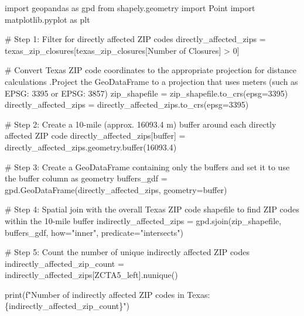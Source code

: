 \documentclass[
  letterpaper,
  DIV=11,
  numbers=noendperiod]{scrartcl}
\newenvironment{Shaded}{\begin{snugshade}}{\end{snugshade}}
\newcommand{\BuiltInTok}[1]{\textcolor[rgb]{0.00,0.23,0.31}{#1}}
\newcommand{\CommentTok}[1]{\textcolor[rgb]{0.37,0.37,0.37}{#1}}
\newcommand{\DecValTok}[1]{\textcolor[rgb]{0.68,0.00,0.00}{#1}}
\newcommand{\FloatTok}[1]{\textcolor[rgb]{0.68,0.00,0.00}{#1}}
\newcommand{\ImportTok}[1]{\textcolor[rgb]{0.00,0.46,0.62}{#1}}
\newcommand{\NormalTok}[1]{\textcolor[rgb]{0.00,0.23,0.31}{#1}}
\newcommand{\OperatorTok}[1]{\textcolor[rgb]{0.37,0.37,0.37}{#1}}
\newcommand{\SpecialCharTok}[1]{\textcolor[rgb]{0.37,0.37,0.37}{#1}}
\newcommand{\SpecialStringTok}[1]{\textcolor[rgb]{0.13,0.47,0.30}{#1}}
\newcommand{\StringTok}[1]{\textcolor[rgb]{0.13,0.47,0.30}{#1}}
\begin{document}
\begin{Shaded}
\begin{Highlighting}[]
\ImportTok{import}\NormalTok{ geopandas }\ImportTok{as}\NormalTok{ gpd}
\ImportTok{from}\NormalTok{ shapely.geometry }\ImportTok{import}\NormalTok{ Point}
\ImportTok{import}\NormalTok{ matplotlib.pyplot }\ImportTok{as}\NormalTok{ plt}

\CommentTok{\# Step 1: Filter for directly affected ZIP codes}
\NormalTok{directly\_affected\_zips }\OperatorTok{=}\NormalTok{ texas\_zip\_closures[texas\_zip\_closures[}\StringTok{\textquotesingle{}Number of Closures\textquotesingle{}}\NormalTok{] }\OperatorTok{\textgreater{}} \DecValTok{0}\NormalTok{]}

\CommentTok{\# Convert Texas ZIP code coordinates to the appropriate projection for distance calculations .Project the GeoDataFrame to a projection that uses meters (such as EPSG: 3395 or EPSG: 3857)}
\NormalTok{zip\_shapefile }\OperatorTok{=}\NormalTok{ zip\_shapefile.to\_crs(epsg}\OperatorTok{=}\DecValTok{3395}\NormalTok{)}
\NormalTok{directly\_affected\_zips }\OperatorTok{=}\NormalTok{ directly\_affected\_zips.to\_crs(epsg}\OperatorTok{=}\DecValTok{3395}\NormalTok{)}

\CommentTok{\# Step 2: Create a 10{-}mile (approx. 16093.4 m) buffer around each directly affected ZIP code}
\NormalTok{directly\_affected\_zips[}\StringTok{\textquotesingle{}buffer\textquotesingle{}}\NormalTok{] }\OperatorTok{=}\NormalTok{ directly\_affected\_zips.geometry.}\BuiltInTok{buffer}\NormalTok{(}\FloatTok{16093.4}\NormalTok{)  }

\CommentTok{\# Step 3: Create a GeoDataFrame containing only the buffers and set it to use the \textquotesingle{}buffer\textquotesingle{} column as geometry}
\NormalTok{buffers\_gdf }\OperatorTok{=}\NormalTok{ gpd.GeoDataFrame(directly\_affected\_zips, geometry}\OperatorTok{=}\StringTok{\textquotesingle{}buffer\textquotesingle{}}\NormalTok{)}

\CommentTok{\# Step 4: Spatial join with the overall Texas ZIP code shapefile to find ZIP codes within the 10{-}mile buffer}
\NormalTok{indirectly\_affected\_zips }\OperatorTok{=}\NormalTok{ gpd.sjoin(zip\_shapefile, buffers\_gdf, how}\OperatorTok{=}\StringTok{"inner"}\NormalTok{, predicate}\OperatorTok{=}\StringTok{"intersects"}\NormalTok{)}

\CommentTok{\# Step 5: Count the number of unique indirectly affected ZIP codes}
\NormalTok{indirectly\_affected\_zip\_count }\OperatorTok{=}\NormalTok{ indirectly\_affected\_zips[}\StringTok{\textquotesingle{}ZCTA5\_left\textquotesingle{}}\NormalTok{].nunique()}

\BuiltInTok{print}\NormalTok{(}\SpecialStringTok{f"Number of indirectly affected ZIP codes in Texas: }\SpecialCharTok{\{}\NormalTok{indirectly\_affected\_zip\_count}\SpecialCharTok{\}}\SpecialStringTok{"}\NormalTok{)}
\end{Highlighting}
\end{Shaded}
\end{document}
